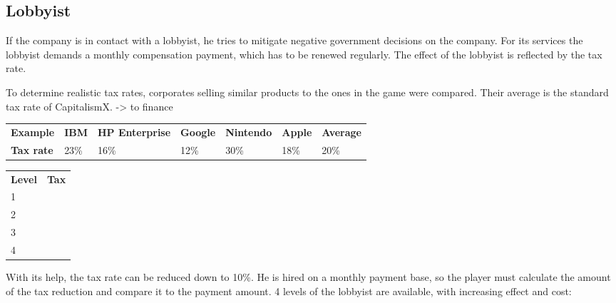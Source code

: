 \subsection{Lobbyist}
If the company is in contact with a lobbyist, he tries to mitigate negative government decisions on the company. For its services the lobbyist demands a monthly compensation payment, which has to be renewed regularly. The effect of the lobbyist is reflected by the tax rate. 

To determine realistic tax rates, corporates selling similar products to the ones in the game were compared. Their average is the standard tax rate of CapitalismX. -> to finance
\begin{table}[]
\begin{tabular}{lllllll}
\textbf{Example}  & \textbf{IBM} & \textbf{HP Enterprise} & \textbf{Google} & \textbf{Nintendo} & \textbf{Apple} & \textbf{Average} \\
\textbf{Tax rate} & 23\%         & 16\%                   & 12\%            & 30\%              & 18\%           & 20\%            
\end{tabular}
\end{table}

\begin{table}[]
\begin{tabular}{ll}
\textbf{Level} & \textbf{Tax} \\
1              &              \\
2              &              \\
3              &              \\
4              &             
\end{tabular}
\end{table}
With its help, the tax rate can be reduced down to 10\%. He is hired on a monthly payment base, so the player must calculate the amount of the tax reduction and compare it to the payment amount. 4 levels of the lobbyist are available, with increasing effect and cost:



